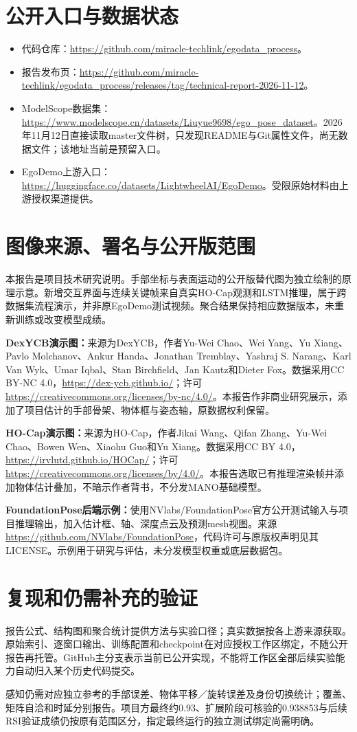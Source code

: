 \FloatBarrier\medskip
{}
{\small}
\clearpage\appendix
\section{公开入口与数据状态}
\begin{itemize}
\item 代码仓库：\url{https://github.com/miracle-techlink/egodata_process}。
\item 报告发布页：\url{https://github.com/miracle-techlink/egodata_process/releases/tag/technical-report-2026-11-12}。
\item ModelScope数据集：\url{https://www.modelscope.cn/datasets/Liuyue9698/ego_pose_dataset}。2026年11月12日直接读取master文件树，只发现README与Git属性文件，尚无数据文件；该地址当前是预留入口。
\item EgoDemo上游入口：\url{https://huggingface.co/datasets/LightwheelAI/EgoDemo}。受限原始材料由上游授权渠道提供。
\end{itemize}

\section{图像来源、署名与公开版范围}
本报告是项目技术研究说明。手部坐标与表面运动的公开版替代图为独立绘制的原理示意。新增交互界面与连续关键帧来自真实HO-Cap观测和LSTM推理，属于跨数据集流程演示，并非原EgoDemo测试视频。聚合结果保持相应数据版本，未重新训练或改变模型成绩。

\textbf{DexYCB演示图：}来源为DexYCB，作者Yu-Wei Chao、Wei Yang、Yu Xiang、Pavlo Molchanov、Ankur Handa、Jonathan Tremblay、Yashraj S. Narang、Karl Van Wyk、Umar Iqbal、Stan Birchfield、Jan Kautz和Dieter Fox。数据采用CC BY-NC 4.0，\url{https://dex-ycb.github.io/}；许可\url{https://creativecommons.org/licenses/by-nc/4.0/}。本报告作非商业研究展示，添加了项目估计的手部骨架、物体框与姿态轴，原数据权利保留。

\textbf{HO-Cap演示图：}来源为HO-Cap，作者Jikai Wang、Qifan Zhang、Yu-Wei Chao、Bowen Wen、Xiaohu Guo和Yu Xiang。数据采用CC BY 4.0，\url{https://irvlutd.github.io/HOCap/}；许可\url{https://creativecommons.org/licenses/by/4.0/}。本报告选取已有推理渲染帧并添加物体估计叠加，不暗示作者背书，不分发MANO基础模型。

\textbf{FoundationPose后端示例：}使用NVlabs/FoundationPose官方公开测试输入与项目推理输出，加入估计框、轴、深度点云及预测mesh视图。来源\url{https://github.com/NVlabs/FoundationPose}，代码许可与原版权声明见其LICENSE。示例用于研究与评估，未分发模型权重或底层数据包。

\section{复现和仍需补充的验证}
报告公式、结构图和聚合统计提供方法与实验口径；真实数据按各上游来源获取。原始索引、逐窗口输出、训练配置和checkpoint在对应授权工作区绑定，不随公开报告再托管。GitHub主分支表示当前已公开实现，不能将工作区全部后续实验能力自动归入某个历史代码提交。

感知仍需对应独立参考的手部误差、物体平移／旋转误差及身份切换统计；覆盖、矩阵自洽和时延分别报告。项目方最终约0.93、扩展阶段可核验的0.938853与后续RSI验证成绩仍按原有范围区分，指定最终运行的独立测试绑定尚需明确。

